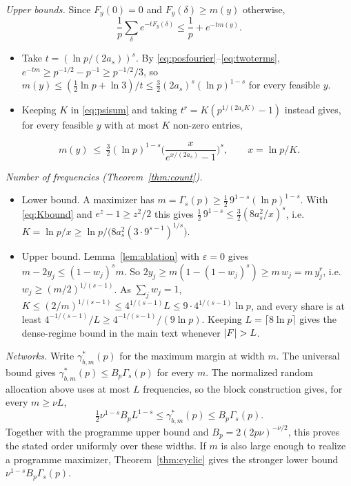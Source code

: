 \emph{Upper bounds.} Since $F_y(0)=0$ and $F_y(\delta)\ge m(y)$ otherwise,
\begin{equation}
\frac1p\sum_\delta e^{-tF_y(\delta)}\le\frac1p+e^{-tm(y)}.
\label{eq:twoterms}
\end{equation}
\begin{itemize}
\item Take $t=(\ln p/(2a_s))^s$. By \eqref{eq:posfourier}--\eqref{eq:twoterms}, $e^{-tm}\ge p^{-1/2}-p^{-1}\ge p^{-1/2}/3$, so $m(y)\le(\frac12\ln p+\ln3)/t\le\frac32(2a_s)^s(\ln p)^{1-s}$ for every feasible $y$.
\item Keeping $K$ in \eqref{eq:psisum} and taking $t^r=K(p^{1/(2a_sK)}-1)$ instead gives, for every feasible $y$ with at most $K$ non-zero entries,
\end{itemize}
\begin{equation}
m(y)\ \le\ \tfrac32(\ln p)^{1-s}\Big(\frac{x}{e^{x/(2a_s)}-1}\Big)^s,\qquad x=\ln p/K.
\label{eq:Kbound}
\end{equation}

\emph{Number of frequencies (Theorem~\ref{thm:count}).}
\begin{itemize}
\item Lower bound. A maximizer has $m=\Gamma_s(p)\ge\tfrac12\,9^{1-s}(\ln p)^{1-s}$. With \eqref{eq:Kbound} and $e^z-1\ge z^2/2$ this gives $\tfrac12\,9^{1-s}\le\frac32(8a_s^2/x)^s$, i.e.\ $K=\ln p/x\ge\ln p/\big(8a_s^2(3\cdot9^{s-1})^{1/s}\big)$.
\item Upper bound. Lemma~\ref{lem:ablation} with $\varepsilon=0$ gives $m-2y_j\le(1-w_j)^sm$. So $2y_j\ge m(1-(1-w_j)^s)\ge m\,w_j=m\,y_j^r$, i.e.\ $w_j\ge(m/2)^{1/(s-1)}$. As $\sum_jw_j=1$, $K\le(2/m)^{1/(s-1)}\le4^{1/(s-1)}L\le9\cdot4^{1/(s-1)}\ln p$, and every share is at least $4^{-1/(s-1)}/L\ge4^{-1/(s-1)}/(9\ln p)$. Keeping $L=\lceil8\ln p\rceil$ gives the dense-regime bound in the main text whenever $|\Fp|>L$.
\end{itemize}

\emph{Networks.} Write $\gamma^*_{b,m}(p)$ for the maximum margin at width $m$. The universal bound gives $\gamma^*_{b,m}(p)\le B_p\Gamma_s(p)$ for every $m$. The normalized random allocation above uses at most $L$ frequencies, so the block construction gives, for every $m\ge\nu L$,
\[
\tfrac12\nu^{1-s}B_pL^{1-s}\le\gamma^*_{b,m}(p)\le B_p\Gamma_s(p).
\]
Together with the programme upper bound and $B_p=2(2p\nu)^{-\nu/2}$, this proves the stated order uniformly over these widths. If $m$ is also large enough to realize a programme maximizer, Theorem~\ref{thm:cyclic} gives the stronger lower bound $\nu^{1-s}B_p\Gamma_s(p)$.

